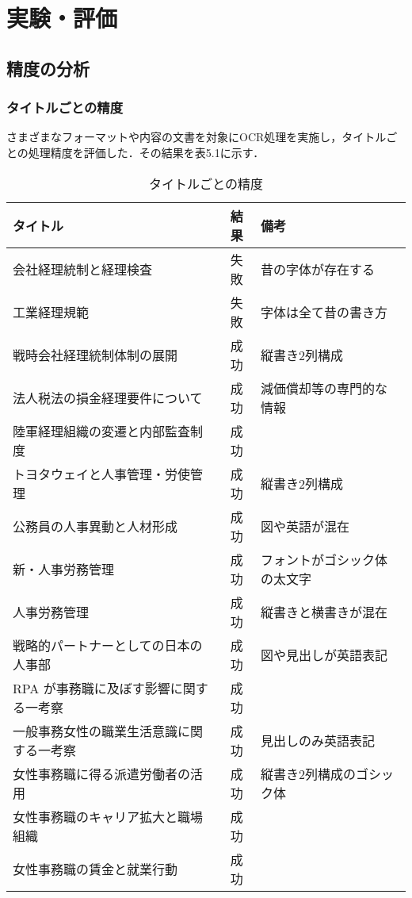 \chapter{実験・評価}
\label{ch:exp}
\quad

\section{精度の分析}
\label{sec:exp_anal}

\subsection{タイトルごとの精度}
\label{subsec:title}

さまざまなフォーマットや内容の文書を対象にOCR処理を実施し，タイトルごとの処理精度を評価した．その結果を表5.1に示す．

\begin{table}[h]
  \begin{center}
  \begin{tabular}{|l|c|l|}
    \hline
    \textbf{タイトル} & \textbf{結果} & \textbf{備考} \\ \hline
    会社経理統制と経理検査 & 失敗 & 昔の字体が存在する \\ \hline
    工業経理規範 & 失敗 & 字体は全て昔の書き方 \\ \hline
    戦時会社経理統制体制の展開 & 成功 & 縦書き2列構成 \\ \hline
    法人税法の損金経理要件について & 成功 & 減価償却等の専門的な情報 \\ \hline
    陸軍経理組織の変遷と内部監査制度 & 成功 & \\ \hline
    トヨタウェイと人事管理・労使管理 & 成功 & 縦書き2列構成 \\ \hline
    公務員の人事異動と人材形成 & 成功 & 図や英語が混在 \\ \hline
    新・人事労務管理 & 成功 & フォントがゴシック体の太文字 \\ \hline
    人事労務管理 & 成功 & 縦書きと横書きが混在 \\ \hline
    戦略的パートナーとしての日本の人事部 & 成功 & 図や見出しが英語表記 \\ \hline
    RPA が事務職に及ぼす影響に関する一考察 & 成功 & \\ \hline
    一般事務女性の職業生活意識に関する一考察 & 成功 & 見出しのみ英語表記 \\ \hline
    女性事務職に得る派遣労働者の活用 & 成功 & 縦書き2列構成のゴシック体 \\ \hline
    女性事務職のキャリア拡大と職場組織 & 成功 & \\ \hline
    女性事務職の賃金と就業行動 & 成功 & \\ \hline
  \end{tabular}
  \end{center}
  \caption{タイトルごとの精度}
  \label{tab:title_accuracy}
\end{table}

